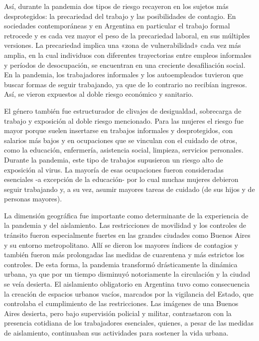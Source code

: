 \begin{refsection}
Así, durante la pandemia dos tipos de riesgo recayeron en los sujetos más desprotegidos: la precariedad del trabajo y las posibilidades de contagio. En sociedades contemporáneas y en Argentina en particular el trabajo formal retrocede y es cada vez mayor el peso de la precariedad laboral, en sus múltiples versiones. La precariedad implica una «zona de vulnerabilidad» \protect\parencite[pág.~13]{4218-CASTEL1995} cada vez más amplia, en la cual individuos con diferentes trayectorias entre empleos informales y períodos de desocupación, se encuentran en una creciente desafiliación social. En la pandemia, los trabajadores informales y los autoempleados tuvieron que buscar formas de seguir trabajando, ya que de lo contrario no recibían ingresos. Así, se vieron expuestos al doble riesgo económico y sanitario.

El género también fue estructurador de clivajes de desigualdad, sobrecarga de trabajo y exposición al doble riesgo mencionado. Para las mujeres el riesgo fue mayor porque suelen insertarse en trabajos informales y desprotegidos, con salarios más bajos y en ocupaciones que se vinculan con el cuidado de otros, como la educación, enfermería, asistencia social, limpieza, servicios personales. Durante la pandemia, este tipo de trabajos supusieron un riesgo alto de exposición al virus. La mayoría de esas ocupaciones fueron consideradas esenciales -a excepción de la educación- por lo cual muchas mujeres debieron seguir trabajando y, a su vez, asumir mayores tareas de cuidado (de sus hijos y de personas mayores).

La dimensión geográfica fue importante como determinante de la experiencia de la pandemia y del aislamiento. Las restricciones de movilidad y los controles de tránsito fueron especialmente fuertes en las grandes ciudades como Buenos Aires y su entorno metropolitano. Allí se dieron los mayores índices de contagios y también fueron más prolongadas las medidas de cuarentena y más estrictos los controles. De esta forma, la pandemia transformó drásticamente la dinámica urbana, ya que por un tiempo disminuyó notoriamente la circulación y la ciudad se veía desierta. El aislamiento obligatorio en Argentina tuvo como consecuencia la creación de espacios urbanos vacíos, marcados por la vigilancia del Estado, que controlaba el cumplimiento de las restricciones. Las imágenes de una Buenos Aires desierta, pero bajo supervisión policial y militar, contrastaron con la presencia cotidiana de los trabajadores esenciales, quienes, a pesar de las medidas de aislamiento, continuaban sus actividades para sostener la vida urbana.


\end{refsection}
